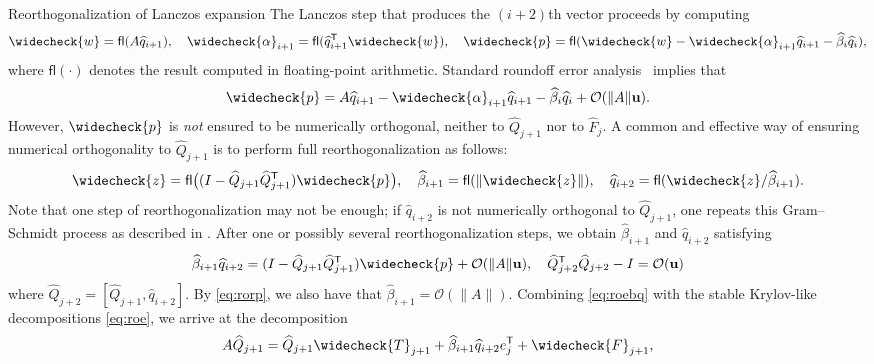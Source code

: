 \documentclass{siamart190516}
\newcommand{\Ttran}{\mathsf{T}}
\newcommand{\order}{\mathcal{O}}
\newcommand{\fl}{\mathsf{fl}}
\newcommand{\mpr}{\mathbf{u}}
\providecommand{\norm}[1]{\lVert#1\rVert}
\begin{document}
\begin{paragraph}{Reorthogonalization of Lanczos expansion}
The Lanczos step that produces the $(i+2)$th vector proceeds by computing
\begin{equation*}
    \widecheck{w} = \fl(A\widehat{q}_{i+1}),\quad 
    \widecheck{\alpha}_{i+1} = \fl(\widehat{q}_{i+1}^{\Ttran}\widecheck{w}) ,\quad
    \widecheck{p} = \fl(\widecheck{w}-\widecheck{\alpha}_{i+1}\widehat{q}_{i+1}-\widehat{\beta}_{i}\widehat{q}_{i}), 
\end{equation*}
where $\fl(\cdot)$ denotes the result computed in floating-point arithmetic. Standard roundoff error analysis~\cite{Higham2002} implies that 
\begin{equation}
    \label{eq:rorp}
    \widecheck{p} = A\widehat{q}_{i+1}-\widecheck{\alpha}_{i+1}\widehat{q}_{i+1}-\widehat{\beta}_{i}\widehat{q}_{i} + \order(\norm{A}\mpr).
\end{equation}
However, $\widecheck{p}$ is \emph{not} ensured to be numerically orthogonal, neither to $\widehat{Q}_{j+1}$ nor to $\widehat{F}_{j}$. A common and effective way of ensuring numerical orthogonality to $\widehat{Q}_{j+1}$ is to perform full reorthogonalization as follows:
\begin{equation*}
    \widecheck{z} = \fl\bigl((I-\widehat{Q}_{j+1}\widehat{Q}_{j+1}^{\Ttran})\widecheck{p}\bigr),\quad 
    \widehat{\beta}_{i+1} = \fl(\norm{\widecheck{z}}),\quad 
    \widehat{q}_{i+2} = \fl(\widecheck{z}/\widehat{\beta}_{i+1}). 
\end{equation*}
Note that one step of reorthogonalization may not be enough; if $\widehat{q}_{i+2}$ is not numerically orthogonal to $\widehat{Q}_{j+1}$, one repeats this Gram--Schmidt process as described in \cite{Giraud2005}. After one or possibly several reorthogonalization steps, we obtain $\widehat{\beta}_{i+1}$ and $\widehat{q}_{i+2}$ satisfying
\begin{equation}
    \label{eq:roebq}
    \widehat{\beta}_{i+1}\widehat{q}_{i+2} = (I-\widehat{Q}_{j+1}\widehat{Q}_{j+1}^{\Ttran})\widecheck{p}+\order(\norm{A}\mpr),\quad
    \widehat{Q}_{j+2}^{\Ttran}\widehat{Q}_{j+2}-I=\order(\mpr)
\end{equation}
where $\widehat{Q}_{j+2}=[\widehat{Q}_{j+1},\widehat{q}_{i+2}]$. By \cref{eq:rorp},
we also have that $\widehat{\beta}_{i+1} = \order(\norm{A})$.
Combining \cref{eq:roebq} with the stable Krylov-like decompositions \cref{eq:roe}, we arrive at the decomposition 
\begin{equation}
    \label{eq:roex}
    A\widehat{Q}_{j+1} = \widehat{Q}_{j+1}\widecheck{T}_{j+1}+\widehat{\beta}_{i+1}\widehat{q}_{i+2}e_{j}^{\Ttran}+\widecheck{F}_{j+1},

\end{equation}
\end{paragraph}
\end{document}
